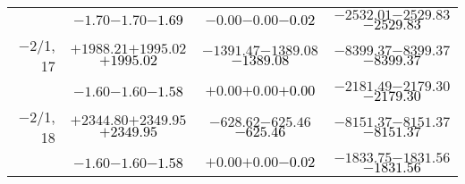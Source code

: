 \documentclass[compress]{beamer}
\begin{document}
\begin{frame}
{\begin{tabular}{r | c | c | c}
           & $-1.70$\hspace{0.1 cm}$-1.70$\hspace{0.1 cm}\textcolor{black}{$-1.69$} & $-0.00$\hspace{0.1 cm}$-0.00$\hspace{0.1 cm}\textcolor{black}{$-0.02$} & $-2532.01$\hspace{0.1 cm}$-2529.83$\hspace{0.1 cm}\textcolor{black}{$-2529.83$} \\
$-$2/1, 17 & $+1988.21$\hspace{0.1 cm}$+1995.02$\hspace{0.1 cm}\textcolor{black}{$+1995.02$} & $-1391.47$\hspace{0.1 cm}$-1389.08$\hspace{0.1 cm}\textcolor{black}{$-1389.08$} & $-8399.37$\hspace{0.1 cm}$-8399.37$\hspace{0.1 cm}\textcolor{black}{$-8399.37$} \\
           & $-1.60$\hspace{0.1 cm}$-1.60$\hspace{0.1 cm}\textcolor{black}{$-1.58$} & $+0.00$\hspace{0.1 cm}$+0.00$\hspace{0.1 cm}\textcolor{black}{$+0.00$} & $-2181.49$\hspace{0.1 cm}$-2179.30$\hspace{0.1 cm}\textcolor{black}{$-2179.30$} \\
$-$2/1, 18 & $+2344.80$\hspace{0.1 cm}$+2349.95$\hspace{0.1 cm}\textcolor{black}{$+2349.95$} & $-628.62$\hspace{0.1 cm}$-625.46$\hspace{0.1 cm}\textcolor{black}{$-625.46$} & $-8151.37$\hspace{0.1 cm}$-8151.37$\hspace{0.1 cm}\textcolor{black}{$-8151.37$} \\
           & $-1.60$\hspace{0.1 cm}$-1.60$\hspace{0.1 cm}\textcolor{black}{$-1.58$} & $+0.00$\hspace{0.1 cm}$+0.00$\hspace{0.1 cm}\textcolor{black}{$-0.02$} & $-1833.75$\hspace{0.1 cm}$-1831.56$\hspace{0.1 cm}\textcolor{black}{$-1831.56$} \\
\end{tabular}}
\end{frame}
\end{document}
